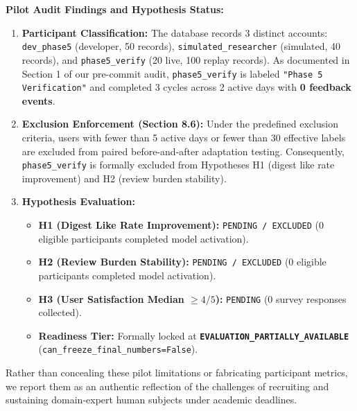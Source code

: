 \noindent\textbf{Pilot Audit Findings and Hypothesis Status:}
\begin{enumerate}
    \item \textbf{Participant Classification:} The database records 3 distinct accounts: \texttt{dev\_phase5} (developer, 50 records), \texttt{simulated\_researcher} (simulated, 40 records), and \texttt{phase5\_verify} (20 live, 100 replay records). As documented in Section 1 of our pre-commit audit, \texttt{phase5\_verify} is labeled \texttt{"Phase 5 Verification"} and completed 3 cycles across 2 active days with \textbf{0 feedback events}.
    \item \textbf{Exclusion Enforcement (Section 8.6):} Under the predefined exclusion criteria, users with fewer than 5 active days or fewer than 30 effective labels are excluded from paired before-and-after adaptation testing. Consequently, \texttt{phase5\_verify} is formally excluded from Hypotheses H1 (digest like rate improvement) and H2 (review burden stability).
    \item \textbf{Hypothesis Evaluation:}
    \begin{itemize}
        \item \textbf{H1 (Digest Like Rate Improvement):} \texttt{PENDING / EXCLUDED} (0 eligible participants completed model activation).
        \item \textbf{H2 (Review Burden Stability):} \texttt{PENDING / EXCLUDED} (0 eligible participants completed model activation).
        \item \textbf{H3 (User Satisfaction Median $\ge 4/5$):} \texttt{PENDING} (0 survey responses collected).
        \item \textbf{Readiness Tier:} Formally locked at \textbf{\texttt{EVALUATION\_PARTIALLY\_AVAILABLE}} (\texttt{can\_freeze\_final\_numbers=False}).
    \end{itemize}
\end{enumerate}

Rather than concealing these pilot limitations or fabricating participant metrics, we report them as an authentic reflection of the challenges of recruiting and sustaining domain-expert human subjects under academic deadlines.
